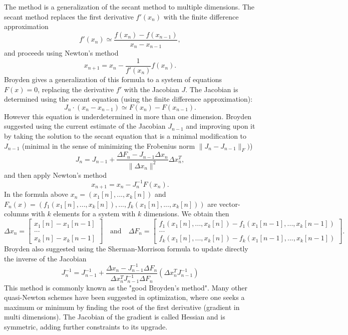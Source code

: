The method is a generalization of the secant method to multiple dimensions. 
The secant method replaces the first derivative $f'(x_n)$ with the finite difference approximation
\[
    f'(x_n) \simeq \frac {f(x_n)-f(x_{n-1})}{x_n-x_{n-1} }, 
\]
and proceeds using Newton's method 
\[
    x_{n+1}=x_n-\frac{1}{f'(x_n)} f(x_n) .
\]
Broyden gives a generalization of this formula to a system of equations $F(x)=0$, replacing the derivative 
$f'$ with the Jacobian $J$. The Jacobian is determined using the secant equation (using the finite difference approximation):
\[
    J_n \cdot (x_n-x_{n-1})\simeq F(x_n)-F(x_{n-1}).
\]
However this equation is underdetermined in more than one dimension. 
Broyden suggested using the current estimate of the Jacobian $J_{n-1}$ and improving upon it 
by taking the solution to the secant equation that is a minimal modification to $J_{n-1}$ (minimal in the sense of minimizing the Frobenius norm $\|J_{n} - J_{n-1}\|_{F})$)
\[
    J_n=J_{n-1}+\frac{\Delta F_n-J_{n-1} \Delta x_n}{\|\Delta x_n\|^2} \Delta x^T_n,
\]
and then apply Newton's method
\[
    x_{n+1}=x_n-J_n^{-1}F(x_n).
\]
In the formula above $x_n=(x_1[n],...,x_k[n])$ and $F_n(x)=(f_1(x_1[n],...,x_k[n]),...,f_k(x_1[n],...,x_k[n]))$ are vector-columns with $k$ elements for a system with $k$ dimensions. We obtain then
\[
\Delta x_n=\begin{bmatrix} x_1[n]-x_1[n-1]\\ ...\\ x_k[n]-x_k[n-1] \end{bmatrix} \quad \text{and} \quad \Delta F_n=\begin{bmatrix} f_1(x_1[n],...,x_k[n])-f_1(x_1[n-1],...,x_k[n-1])\\ ...\\ f_k(x_1[n],...,x_k[n])-f_k(x_1[n-1],...,x_k[n-1]) \end{bmatrix}.
\]
Broyden also suggested using the Sherman-Morrison formula to update directly the inverse of the Jacobian
\[
    J_n^{-1}=J_{n-1}^{-1}+\frac{\Delta x_n-J^{-1}_{n-1} \Delta F_n}{\Delta x_n^T J^{-1}_{n-1}\Delta F_n} (\Delta x_n^T J^{-1}_{n-1})
\]
This method is commonly known as the "good Broyden's method". 
Many other quasi-Newton schemes have been suggested in optimization, where one seeks a maximum or minimum by finding the root of the first derivative (gradient in multi dimensions). The Jacobian of the gradient is called Hessian and is symmetric, adding further constraints to its upgrade.



